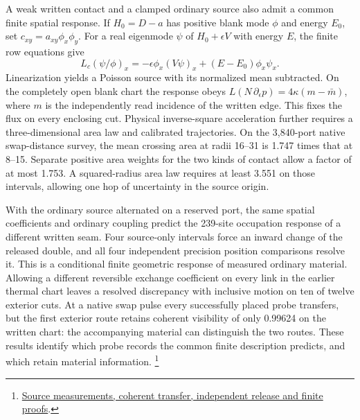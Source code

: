 \documentclass[11pt]{article}
\begin{document}
A weak written contact and a clamped ordinary source also admit a
common finite spatial response. If $H_0=D-a$ has positive blank mode
$\phi$ and energy $E_0$, set $c_{xy}=a_{xy}\phi_x\phi_y$. For a real
eigenmode $\psi$ of $H_0+\epsilon V$ with energy $E$, the finite row
equations give
\[
 L_c(\psi/\phi)_x=-\epsilon\phi_x(V\psi)_x+(E-E_0)\phi_x\psi_x .
\]
Linearization yields a Poisson source with its normalized mean
subtracted. On the completely open blank chart the response obeys
$L(N\,\partial_\epsilon p)=4\kappa(m-\bar m)$, where $m$ is the
independently read incidence of the written edge. This fixes the flux
on every enclosing cut. Physical inverse-square acceleration further
requires a three-dimensional area law and calibrated trajectories. On the
3,840-port native swap-distance survey, the mean crossing area at
radii 16--31 is 1.747 times that at 8--15. Separate positive area
weights for the two kinds of contact allow a factor of at most 1.753.
A squared-radius area law requires at least 3.551 on those intervals,
allowing one hop of uncertainty in the source origin.

With the ordinary source alternated on a reserved port, the same
spatial coefficients and ordinary coupling predict the 239-site
occupation response of a different written seam. Four source-only
intervals force an inward change of the released double, and all four
independent precision position comparisons resolve it. This is a
conditional finite geometric response of measured ordinary material.
Allowing a different reversible exchange coefficient on every link in
the earlier thermal chart leaves a resolved discrepancy with
inclusive motion on ten of twelve exterior cuts. At a native swap
pulse every successfully placed probe transfers, but the first exterior
route retains coherent visibility of only 0.99624 on the written chart:
the accompanying material can distinguish the two routes. These
results identify which probe records the common finite description
predicts, and which retain material information.%
\footnote{\href{https://github.com/FloatingPragma/observer-patch-holography/tree/main/model/experiments/interval_echo_shell_flux/product_address/green_response/material_recoil/overlap_source/native_boundary/stock/aperture}{Source measurements, coherent transfer, independent release and finite proofs}.}
\end{document}
